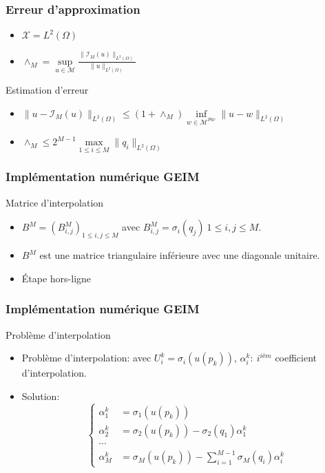 \documentclass[a4paper,10pt]{beamer}
\numberwithin{equation}{section}
\begin{document}
\begin{frame}
\frametitle{\sc Erreur d'approximation}
\begin{block}{}
	\begin{itemize}
		\item $\mathcal{X}=L^{2}(\Omega)$
	 \item $\land_{M}=\underset{u \in \mathcal{M}}{\sup} \frac{\| \mathcal{I}_{M}(u)\|_{L^{2}(\Omega)}}{\| u\|_{L^{2}(\Omega)}} $
  \end{itemize}
\end{block}
\begin{block}{Estimation d'erreur}
	\begin{itemize}
		\item $\|u-\mathcal{I}_{M}(u) \|_{L^{2}(\Omega)}\leq (1+\land_{M})\underset{w \in \mathcal{M}^{Par}}{\inf} \| u-w\|_{L^{2}(\Omega)}$
		\item $\land_{M}\leq 2^{M-1}\underset{1\leq i\leq M}{\max} \| q_{i}\|_{L^{2}(\Omega)}$
	\end{itemize}
\end{block}   
\end{frame}
\begin{frame}
\frametitle{\sc Implémentation numérique GEIM}
\begin{block}{\sc Matrice d'interpolation}
	\begin{itemize}
		\item $B^{M}=(B_{i,j}^{M})_{ 1\leq i,j \leq M }$ avec  $B_{i,j}^{M}=\sigma_{i}(q_{j})\ 1\leq i,j \leq M$.
		\item $B^{M}$ est une matrice triangulaire inférieure avec une diagonale unitaire.
        \item Étape hors-ligne
	\end{itemize}
\end{block}
\end{frame}
\begin{frame}
\frametitle{\sc Implémentation numérique GEIM}
\begin{block}{Problème d'interpolation}
	\begin{itemize}
			\item Problème d'interpolation:  avec $U_{i}^{k}=\sigma_{i}(u(p_{k}))$, $\alpha_{i}^{k}:\ i^{iém} $ coefficient d'interpolation.
			\item Solution:
			\begin{equation}
			\left\{
			\begin{array}{rl}
			\alpha_{1}^{k}&=\sigma_{1}(u(p_{k})) \\
			\alpha_{2}^{k}&=\sigma_{2}(u(p_{k}))-\sigma_{2}(q_{1})\alpha_{1}^{k}\\
			\cdots\\ 
			\alpha_{M}^{k}&=\sigma_{M}(u(p_{k}))-\sum_{i=1}^{M-1}\sigma_{M}(q_{i})\alpha_{i}^{k}
			\end{array}\right.
			\end{equation}
	\end{itemize}
\end{block}
\end{frame}
\end{document}
